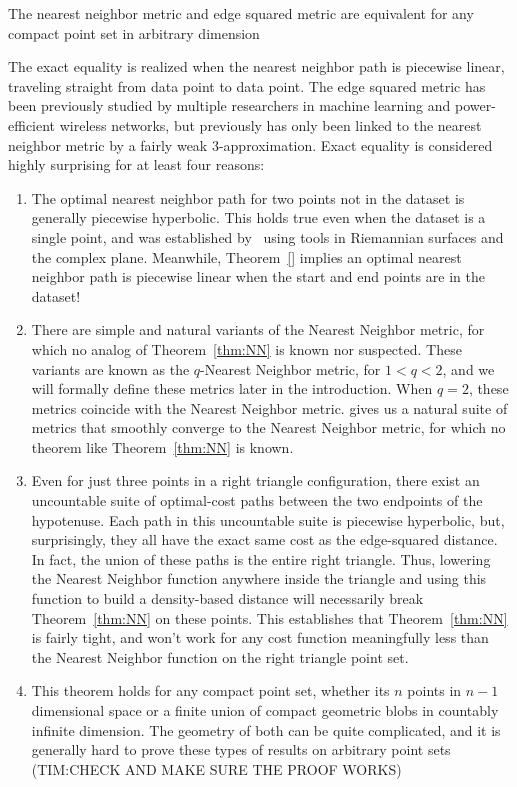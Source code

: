 \begin{theorem}\label{thm:NN} The nearest neighbor metric and edge squared
metric are equivalent for any compact point set in arbitrary dimension
\end{theorem}

The exact equality is realized when the nearest neighbor path is piecewise
linear, traveling straight from data point to data point. The edge squared
metric has been previously studied by multiple researchers in machine
learning and power-efficient wireless networks, but previously has only
been linked to the nearest neighbor metric by a fairly weak
3-approximation. Exact equality is considered highly surprising for at
least four reasons:

\begin{enumerate}

\item The optimal nearest neighbor path for two points not in the dataset
	is generally piecewise hyperbolic. This holds true even when the
		dataset is a single point, and was established by~\cite{}
		using tools in Riemannian surfaces and the complex plane.
		Meanwhile, Theorem~\ref{} implies an optimal nearest
		neighbor path is piecewise linear when the start and end
		points are in the dataset!

\item There are simple and natural variants of the Nearest Neighbor metric,
	for which no analog of Theorem~\ref{thm:NN} is known nor suspected.
		These variants are known as the $q$-Nearest Neighbor
		metric, for $1 < q < 2$, and we will formally define these
		metrics later in the introduction. When $q=2$, these
		metrics coincide with the Nearest Neighbor metric. %
		gives us a natural suite of metrics that smoothly converge
		to the Nearest Neighbor metric, for which no theorem like
		Theorem~\ref{thm:NN} is known.

\item Even for just three points in a right triangle configuration, there
	exist an uncountable suite of optimal-cost paths between the two
		endpoints of the hypotenuse. Each path in this uncountable
		suite is piecewise hyperbolic, but, surprisingly, they all
		have the exact same cost as the edge-squared distance. In
		fact, the union of these paths is the entire right
		triangle. Thus, lowering the Nearest Neighbor function
		anywhere inside the triangle and using this function to
		build a density-based distance will necessarily break
		Theorem~\ref{thm:NN} on these points. This establishes that
		Theorem~\ref{thm:NN} is fairly tight, and won't work for
		any cost function meaningfully less than the Nearest
		Neighbor function on the right triangle point set.

\item This theorem holds for any compact point set, whether its $n$ points
	in $n-1$ dimensional space or a finite union of compact geometric
		blobs in countably infinite dimension. The geometry of both
		can be quite complicated, and it is generally hard to prove
		these types of results on arbitrary point sets (TIM:CHECK
		AND MAKE SURE THE PROOF WORKS)

\end{enumerate}

